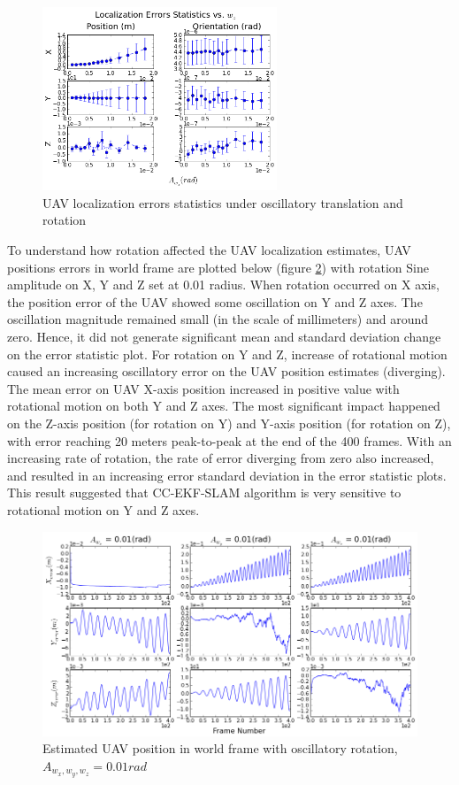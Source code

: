 \begin{figure}[h]
  \includegraphics[width=7cm, keepaspectratio=true]{./Figures/SimulationFigures/Figure13.png}
  \caption{UAV localization errors statistics under oscillatory translation and rotation} 
  \label{fig:simfig9-10}
\end{figure}
\FloatBarrier

To understand how rotation affected the UAV localization estimates,
UAV positions errors in world frame are plotted below (figure
\ref{fig:simfig14}) with rotation Sine amplitude on X, Y and Z set at
0.01 radius. When rotation occurred on X axis, the position error of
the UAV showed some oscillation on Y and Z axes. The oscillation
magnitude remained small (in the scale of millimeters) and around
zero. Hence, it did not generate significant mean and standard deviation
change on the error statistic plot. For rotation on Y and Z, increase
of rotational motion caused an increasing oscillatory error on the UAV
position estimates (diverging). The mean error on UAV X-axis position
increased in positive value with rotational motion on both Y and Z
axes. The most significant impact happened on the Z-axis position (for
rotation on Y) and Y-axis position (for rotation on Z), with error
reaching 20 meters peak-to-peak at the end of the 400 frames. With an
increasing rate of rotation, the rate of
error diverging from zero also increased, and resulted in an
increasing error standard deviation in the error statistic plots. This
result suggested that CC-EKF-SLAM algorithm is very
sensitive to rotational motion on Y and Z axes.

\begin{figure}[h]
  \centering
  \includegraphics[width=13cm, keepaspectratio=true]{./Figures/SimulationFigures/Figure14.png}
  \caption{Estimated UAV position in world frame with oscillatory
    rotation, $A_{w_x,w_y,w_z} = 0.01 rad$}
  \label{fig:simfig14}
\end{figure}
\FloatBarrier

